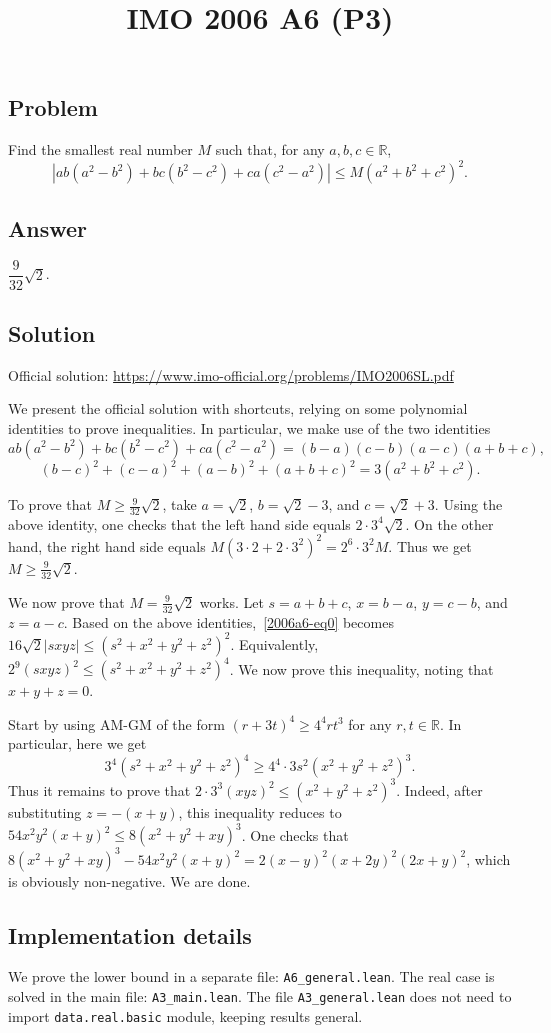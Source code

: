 \documentclass{article}
\title{IMO 2006 A6 (P3)}
\author{}
\date{}
\newcommand{\R}{\mathbb{R}}
\begin{document}
\maketitle



\subsection*{Problem}

Find the smallest real number $M$ such that, for any $a, b, c \in \R$,
\[ |ab(a^2 - b^2) + bc(b^2 - c^2) + ca(c^2 - a^2)| \leq M(a^2 + b^2 + c^2)^2. \tag{*}\label{2006a6-eq0} \]



\subsection*{Answer}

$\dfrac{9}{32} \sqrt{2}$.



\subsection*{Solution}

Official solution: \url{https://www.imo-official.org/problems/IMO2006SL.pdf}

We present the official solution with shortcuts, relying on some polynomial identities to prove inequalities.
In particular, we make use of the two identities
\[ ab(a^2 - b^2) + bc(b^2 - c^2) + ca(c^2 - a^2) = (b - a)(c - b)(a - c)(a + b + c), \]
\[ (b - c)^2 + (c - a)^2 + (a - b)^2 + (a + b + c)^2 = 3(a^2 + b^2 + c^2). \]

To prove that $M \geq \frac{9}{32} \sqrt{2}$, take $a = \sqrt{2}$, $b = \sqrt{2} - 3$, and $c = \sqrt{2} + 3$.
Using the above identity, one checks that the left hand side equals $2 \cdot 3^4 \sqrt{2}$.
On the other hand, the right hand side equals $M(3 \cdot 2 + 2 \cdot 3^2)^2 = 2^6 \cdot 3^2 M$.
Thus we get $M \geq \frac{9}{32} \sqrt{2}$.

We now prove that $M = \frac{9}{32} \sqrt{2}$ works.
Let $s = a + b + c$, $x = b - a$, $y = c - b$, and $z = a - c$.
Based on the above identities,~\eqref{2006a6-eq0} becomes $16 \sqrt{2} |sxyz| \leq (s^2 + x^2 + y^2 + z^2)^2$.
Equivalently, $2^9 (sxyz)^2 \leq (s^2 + x^2 + y^2 + z^2)^4$.
We now prove this inequality, noting that $x + y + z = 0$.

Start by using AM-GM of the form $(r + 3t)^4 \geq 4^4 rt^3$ for any $r, t \in \R$.
In particular, here we get
\[ 3^4 (s^2 + x^2 + y^2 + z^2)^4 \geq 4^4 \cdot 3 s^2 (x^2 + y^2 + z^2)^3. \]
Thus it remains to prove that $2 \cdot 3^3 (xyz)^2 \leq (x^2 + y^2 + z^2)^3$.
Indeed, after substituting $z = -(x + y)$, this inequality reduces to $54 x^2 y^2 (x + y)^2 \leq 8 (x^2 + y^2 + xy)^3$.
One checks that $8 (x^2 + y^2 + xy)^3 - 54 x^2 y^2 (x + y)^2 = 2 (x - y)^2 (x + 2y)^2 (2x + y)^2$, which is obviously non-negative.
We are done.



\subsection*{Implementation details}

We prove the lower bound in a separate file: \texttt{A6\_general.lean}.
The real case is solved in the main file: \texttt{A3\_main.lean}.
The file \texttt{A3\_general.lean} does not need to import \texttt{data.real.basic} module, keeping results general.
\end{document}

